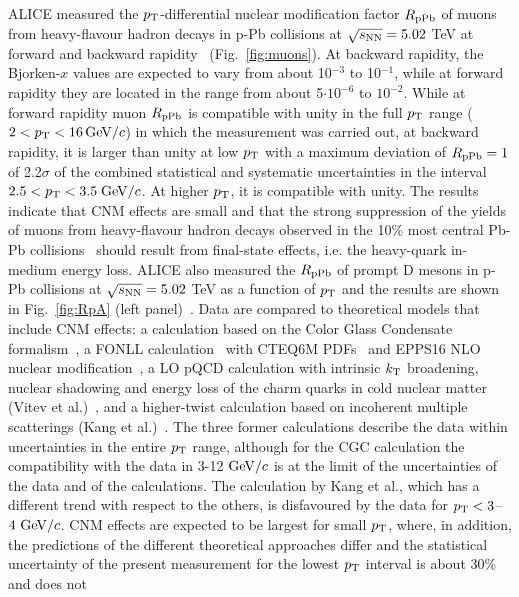 ALICE measured the $p_{\rm T}$-differential nuclear modification factor 
$R_{\rm pPb}$ of muons from heavy-flavour hadron decays in p-Pb collisions at $\sqrt{s_{\rm NN}} = 5.02$ TeV
at forward and backward rapidity~\cite{Acharya:2017hdv} (Fig.~\ref{fig:muons}).
At backward rapidity, the Bjorken-$x$ values are expected to vary from about 10$^{-3}$ to 10$^{-1}$, 
while at forward rapidity they are located in the range from about 5$\cdot 10^{-6}$ to $10^{-2}$.
While at forward rapidity muon $R_{\rm pPb}$ is compatible 
with unity in the full $p_{\rm T}$ range ($2 <p_{\rm T} < 16 \, \mathrm{GeV}/c$) in which the 
measurement was carried out, 
at backward rapidity, it is larger than unity at low $p_{\rm T}$ with a maximum 
deviation of $R_{\rm pPb}=1$ of 2.2$\sigma$ of the combined statistical and 
systematic uncertainties in the interval $2.5 < p_{\rm T} < 3.5 \;\mathrm{GeV}/c$. 
At higher $p_{\rm T}$, it is compatible with unity. The results indicate
that CNM effects are small and that the strong suppression of the
yields of muons from heavy-flavour hadron decays observed in the
10\% most central Pb-Pb collisions~\cite{Abelev:2012qh} should result from final-state
effects, i.e. the heavy-quark in-medium energy loss. 
ALICE also measured the $R_{\rm pPb}$ of prompt 
D mesons in p-Pb collisions at $\sqrt{s_{\rm NN}} = 5.02$ TeV
as a function of $p_{\rm T}$ and the results are shown in 
Fig.~\ref{fig:RpA} (left panel)~\cite{ALICEPAS2017008}. 
Data are compared to theoretical models that include CNM effects: 
a calculation based on the Color Glass Condensate
formalism~\cite{Fujii:2013yja,Fujii:2017rqa}, a FONLL 
calculation~\cite{Cacciari:2012ny} with CTEQ6M PDFs~\cite{Pumplin:2002vw} 
and EPPS16 NLO nuclear modification~\cite{Eskola:2016oht}, 
a LO pQCD calculation with intrinsic $k_{\rm T}$ broadening, 
nuclear shadowing and energy loss of the charm quarks 
in cold nuclear matter (Vitev et al.)~\cite{Sharma:2009hn}, 
and a higher-twist calculation based on incoherent multiple 
scatterings (Kang et al.)~\cite{Kang:2014hha}. 
The three former calculations describe the data within 
uncertainties in the entire $p_{\rm T}$ range, although for the CGC 
calculation the compatibility with the data 
in 3-12 $\mathrm{GeV}/c$ is at the limit of the uncertainties of the data 
and of the calculations. The calculation by Kang et al., which has 
a different trend with respect to the others, is disfavoured by the 
data for $p_{\rm T}<3$--$4~\mathrm{GeV}/c$.
CNM effects are expected to be largest for small $p_{\rm T}$, where, in 
addition, the predictions of the different theoretical approaches differ 
and the statistical uncertainty of the present measurement for the 
lowest $p_{\rm T}$ interval is about 30\% and does not 
